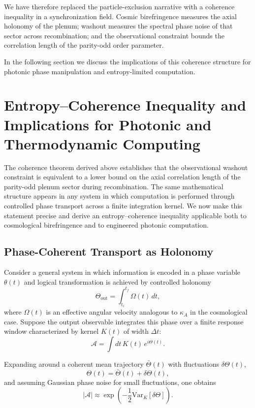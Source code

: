 \documentclass[12pt]{article}
\begin{document}
\medskip

We have therefore replaced the particle-exclusion narrative with a coherence inequality in a synchronization field. Cosmic birefringence measures the axial holonomy of the plenum; washout measures the spectral phase noise of that sector across recombination; and the observational constraint bounds the correlation length of the parity-odd order parameter.

In the following section we discuss the implications of this coherence structure for photonic phase manipulation and entropy-limited computation.

\newpage
\section{Entropy--Coherence Inequality and Implications for Photonic and Thermodynamic Computing}

The coherence theorem derived above establishes that the observational washout constraint is equivalent to a lower bound on the axial correlation length of the parity-odd plenum sector during recombination. The same mathematical structure appears in any system in which computation is performed through controlled phase transport across a finite integration kernel. We now make this statement precise and derive an entropy--coherence inequality applicable both to cosmological birefringence and to engineered photonic computation.

\subsection*{Phase-Coherent Transport as Holonomy}

Consider a general system in which information is encoded in a phase variable $\theta(t)$ and logical transformation is achieved by controlled holonomy
\begin{equation}
\Theta_{\mathrm{out}}
=
\int_{t_i}^{t_f}
\Omega(t)\, dt,
\end{equation}
where $\Omega(t)$ is an effective angular velocity analogous to $\kappa_A$ in the cosmological case. Suppose the output observable integrates this phase over a finite response window characterized by kernel $K(t)$ of width $\Delta t$:
\begin{equation}
\mathcal{A}
=
\int dt \,
K(t)
\,
e^{i \Theta(t)}.
\end{equation}

Expanding around a coherent mean trajectory $\bar{\Theta}(t)$ with fluctuations $\delta\Theta(t)$,
\begin{equation}
\Theta(t)
=
\bar{\Theta}(t)
+
\delta\Theta(t),
\end{equation}
and assuming Gaussian phase noise for small fluctuations, one obtains
\begin{equation}
|\mathcal{A}|
\approx
\exp
\left(
-\frac{1}{2}
\mathrm{Var}_K[\delta\Theta]
\right).
\end{equation}
\end{document}
